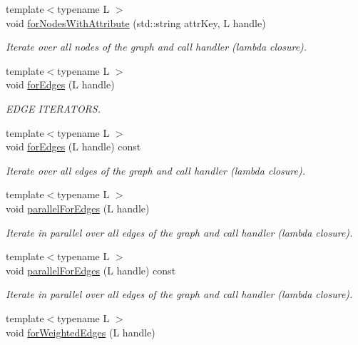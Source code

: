 \begin{DoxyCompactItemize}
{\footnotesize template$<$typename L $>$ }\\void \hyperlink{class_ensemble_clustering_1_1_graph_af5dda00110f96dba8718ecd73ea12aa5}{for\-Nodes\-With\-Attribute} (std\-::string attr\-Key, L handle)
\begin{DoxyCompactList}\small\item\em Iterate over all nodes of the graph and call handler (lambda closure). \end{DoxyCompactList}\item 
{\footnotesize template$<$typename L $>$ }\\void \hyperlink{class_ensemble_clustering_1_1_graph_aa3ebe7aca7e7da22643200dfa6097856}{for\-Edges} (L handle)
\begin{DoxyCompactList}\small\item\em E\-D\-G\-E I\-T\-E\-R\-A\-T\-O\-R\-S. \end{DoxyCompactList}\item 
{\footnotesize template$<$typename L $>$ }\\void \hyperlink{class_ensemble_clustering_1_1_graph_a936a34fb03a82e1913762fe9d441f7bf}{for\-Edges} (L handle) const 
\begin{DoxyCompactList}\small\item\em Iterate over all edges of the graph and call handler (lambda closure). \end{DoxyCompactList}\item 
{\footnotesize template$<$typename L $>$ }\\void \hyperlink{class_ensemble_clustering_1_1_graph_a7c270873ce32fa38e17d6dcc598570ef}{parallel\-For\-Edges} (L handle)
\begin{DoxyCompactList}\small\item\em Iterate in parallel over all edges of the graph and call handler (lambda closure). \end{DoxyCompactList}\item 
{\footnotesize template$<$typename L $>$ }\\void \hyperlink{class_ensemble_clustering_1_1_graph_a48f2156ed2501058aa57f4f6f1b9bbeb}{parallel\-For\-Edges} (L handle) const 
\begin{DoxyCompactList}\small\item\em Iterate in parallel over all edges of the graph and call handler (lambda closure). \end{DoxyCompactList}\item 
{\footnotesize template$<$typename L $>$ }\\void \hyperlink{class_ensemble_clustering_1_1_graph_a09e93835ed75201769358fa6b35537e8}{for\-Weighted\-Edges} (L handle)

\end{DoxyCompactItemize}
